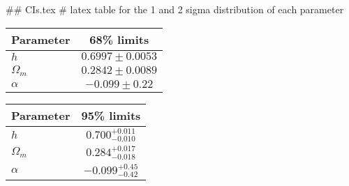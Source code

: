 ## CIs.tex
# latex table for the 1 and 2 sigma distribution of each parameter

\begin{tabular} { l  c}
 Parameter &  68\% limits\\
\hline
{\boldmath$h              $} & $0.6997\pm 0.0053          $\\
{\boldmath$\Omega_m       $} & $0.2842\pm 0.0089          $\\
{\boldmath$\alpha         $} & $-0.099\pm 0.22            $\\
\hline
\end{tabular}

\begin{tabular} { l  c}
 Parameter &  95\% limits\\
\hline
{\boldmath$h              $} & $0.700^{+0.011}_{-0.010}   $\\
{\boldmath$\Omega_m       $} & $0.284^{+0.017}_{-0.018}   $\\
{\boldmath$\alpha         $} & $-0.099^{+0.45}_{-0.42}    $\\
\hline
\end{tabular}
